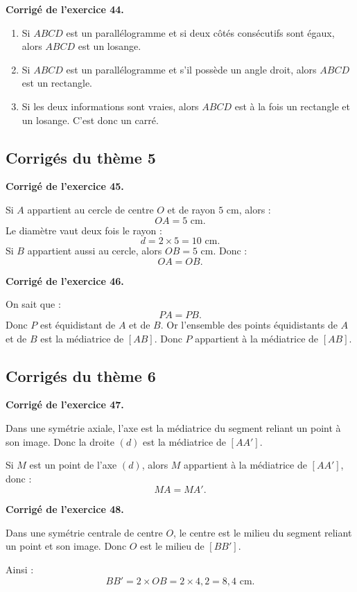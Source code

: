 \documentclass[11pt,a4paper]{article}
\newcounter{exercice}
\newenvironment{corrige}[1][]
{\par\medskip\noindent\textbf{Corrigé de l'exercice #1.}\par\smallskip}
{\medskip}
\begin{document}
\begin{corrige}[44]
\begin{enumerate}
\item Si $ABCD$ est un parallélogramme et si deux côtés consécutifs sont égaux, alors $ABCD$ est un losange.
\item Si $ABCD$ est un parallélogramme et s'il possède un angle droit, alors $ABCD$ est un rectangle.
\item Si les deux informations sont vraies, alors $ABCD$ est à la fois un rectangle et un losange. C'est donc un carré.
\end{enumerate}
\end{corrige}

\subsection*{Corrigés du thème 5}

\begin{corrige}[45]
Si $A$ appartient au cercle de centre $O$ et de rayon $5$ cm, alors :
\[
OA=5\text{ cm}.
\]
Le diamètre vaut deux fois le rayon :
\[
d=2\times5=10\text{ cm}.
\]
Si $B$ appartient aussi au cercle, alors $OB=5$ cm. Donc :
\[
OA=OB.
\]
\end{corrige}

\begin{corrige}[46]
On sait que :
\[
PA=PB.
\]
Donc $P$ est équidistant de $A$ et de $B$. Or l'ensemble des points équidistants de $A$ et de $B$ est la médiatrice de $[AB]$. Donc $P$ appartient à la médiatrice de $[AB]$.
\end{corrige}

\subsection*{Corrigés du thème 6}

\begin{corrige}[47]
Dans une symétrie axiale, l'axe est la médiatrice du segment reliant un point à son image. Donc la droite $(d)$ est la médiatrice de $[AA']$.

Si $M$ est un point de l'axe $(d)$, alors $M$ appartient à la médiatrice de $[AA']$, donc :
\[
MA=MA'.
\]
\end{corrige}

\begin{corrige}[48]
Dans une symétrie centrale de centre $O$, le centre est le milieu du segment reliant un point et son image. Donc $O$ est le milieu de $[BB']$.

Ainsi :
\[
BB'=2\times OB=2\times4,2=8,4\text{ cm}.
\]
\end{corrige}
\end{document}
